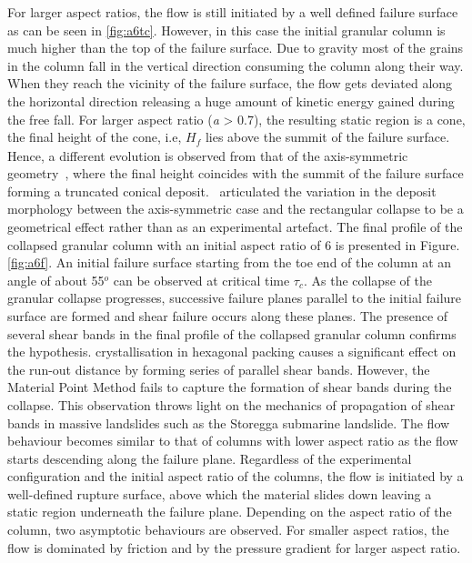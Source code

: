 For larger aspect ratios, the flow is still initiated by a well defined failure 
surface as can be seen in \cref{fig:a6tc}. However, in this case the 
initial granular column is much higher than the top of the failure surface. Due 
to gravity most of the grains in the column fall in the vertical direction 
consuming the column along their way. When they reach the vicinity of the 
failure surface, the flow gets deviated along the horizontal direction 
releasing a huge amount of kinetic energy gained during the free fall. For 
larger aspect ratio (\textit{a} > 0.7), the resulting static region is a cone, 
the final height of the cone, i.e, $\textit{H}_{\textit{f}}$ lies above the 
summit of the failure surface. Hence, a different evolution is observed from 
that of the axis-symmetric geometry~\citep{Lube2005}, where the final height 
coincides with the summit of the failure surface forming a truncated conical 
deposit.~\citet{Lajeunesse2004} articulated the variation in the deposit 
morphology between the axis-symmetric case and the rectangular collapse to be a 
geometrical effect rather than as an experimental artefact. The final profile 
of the collapsed granular column with an initial aspect ratio of 6 is presented 
in Figure.\ref{fig:a6f}. An initial failure surface starting from the toe end 
of the column at an angle of about 55$^{o}$ can be observed at critical time 
$\tau_{c}$. As the collapse of the granular collapse progresses, successive 
failure planes parallel to the initial failure surface are formed and shear 
failure occurs along these planes. The presence of several shear bands in the 
final profile of the collapsed granular column confirms the hypothesis. 
crystallisation in hexagonal packing causes a significant effect on the run-out 
distance by forming series of parallel shear bands. However, the Material Point 
Method fails to capture the formation of shear bands during the collapse. This 
observation throws light on the mechanics of propagation of shear bands in 
massive landslides such as the Storegga submarine landslide. The flow behaviour 
becomes similar to that of columns with lower aspect ratio as the flow starts 
descending along the failure plane. Regardless of the experimental 
configuration and the initial aspect ratio of the columns, the flow is 
initiated by a well-defined rupture surface, above which the material slides 
down leaving a static region underneath the failure plane. Depending on the 
aspect ratio of the column, two asymptotic behaviours are observed. For smaller 
aspect ratios, the flow is dominated by friction and by the pressure gradient 
for larger aspect ratio.

